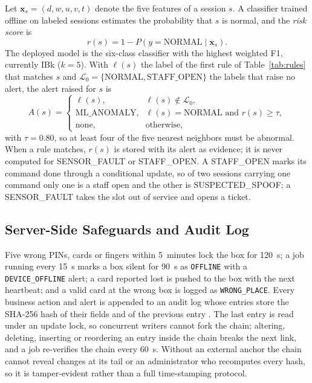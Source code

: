 \documentclass[sigconf,screen]{acmart}
\begin{document}
Let $\mathbf{x}_s = (d, w, u, v, t)$ denote the five features of a session $s$. A classifier trained offline on
labeled sessions estimates the probability that $s$ is normal, and the \emph{risk score} is
\begin{equation}
r(s) = 1 - P\left(y = \text{NORMAL} \mid \mathbf{x}_s\right).
\label{eq:risk}
\end{equation}
The deployed model is the six-class classifier with the highest weighted F1, currently IBk ($k=5$). With $\ell(s)$ the
label of the first rule of Table~\ref{tab:rules} that matches $s$ and $\mathcal{L}_0 = \{\text{NORMAL},
\text{STAFF\_OPEN}\}$ the labels that raise no alert, the alert raised for $s$ is
\begin{equation}
A(s) =
\begin{cases}
\ell(s), & \ell(s) \notin \mathcal{L}_0,\\
\text{ML\_ANOMALY}, & \ell(s) = \text{NORMAL} \text{ and } r(s) \geq \tau,\\
\text{none}, & \text{otherwise},
\end{cases}
\label{eq:alert}
\end{equation}
with $\tau = 0.80$, so at least four of the five nearest neighbors must be abnormal. When a rule matches, $r(s)$ is
stored with its alert as evidence; it is never computed for SENSOR\_FAULT or STAFF\_OPEN. A STAFF\_OPEN marks its
command done through a conditional update, so of two sessions carrying one command only one is a staff open and the
other is SUSPECTED\_SPOOF; a SENSOR\_FAULT takes the slot out of service and opens a ticket.

\subsection{Server-Side Safeguards and Audit Log}\label{sec:safeguards}

Five wrong PINs, cards or fingers within 5~minutes lock the box for 120~s; a job running every 15~s marks a box
silent for 90~s as \texttt{OFFLINE} with a \texttt{DEVICE\_OFFLINE} alert; a card reported lost is pushed to the box
with the next heartbeat; and a valid card at the wrong box is logged as \texttt{WRONG\_PLACE}. Every business action
and alert is appended to an audit log whose entries store the SHA-256 hash of their fields and of the previous entry
\cite{haber1991timestamp}. The last entry is read under an update lock, so concurrent writers cannot fork the chain;
altering, deleting, inserting or reordering an entry inside the chain breaks the next link, and a job re-verifies the
chain every 60~s. Without an external anchor the chain cannot reveal changes at its tail or an administrator who recomputes every
hash, so it is tamper-evident rather than a full time-stamping protocol.
\end{document}
